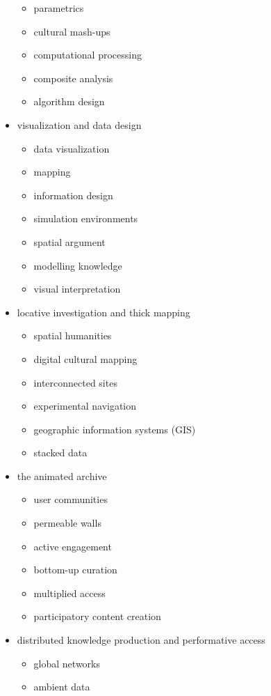 \begin{multicols}{2}
\begin{itemize}
\begin{itemize}
    \item parametrics
    \item	cultural mash-ups
    \item	computational processing
    \item	composite analysis
    \item	algorithm design
  \end{itemize}
  \item visualization and data design
  \begin{itemize}
    \item data visualization
    \item	mapping
    \item	information design
    \item	simulation environments
    \item	spatial argument
    \item	modelling knowledge
    \item	visual interpretation
  \end{itemize}
  \item locative investigation and thick mapping
  \begin{itemize}
    \item spatial humanities
    \item	digital cultural mapping
    \item	interconnected sites
    \item	experimental navigation
    \item	geographic information systems (GIS)
    \item	stacked data
  \end{itemize}
  \item the animated archive
  \begin{itemize}
    \item user communities
    \item	permeable walls
    \item	active engagement
    \item	bottom-up curation
    \item	multiplied access
    \item	participatory content creation
  \end{itemize}
  \item distributed knowledge production and performative access
  \begin{itemize}
    \item global networks
    \item	ambient data

\end{itemize}
\end{itemize}
\end{multicols}

